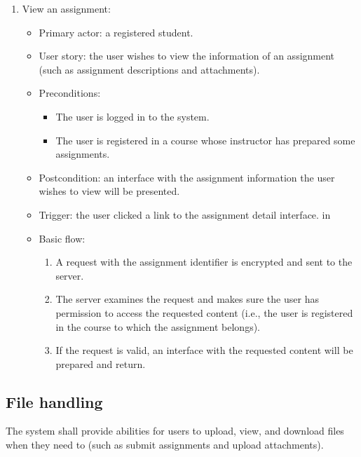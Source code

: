 \begin{enumerate}
\item View an assignment:
\begin{itemize}
    \item Primary actor: a registered student.
    \item User story: the user wishes to view the information of an assignment
     (such as assignment descriptions and attachments).
    \item Preconditions:
        \begin{itemize}
            \item The user is logged in to the system.
            \item The user is registered in a course whose instructor has
                prepared some assignments.
        \end{itemize}
    \item Postcondition: an interface with the assignment information the user
        wishes to view will be presented.
    \item Trigger: the user clicked a link to the assignment detail interface.
     in
    \item Basic flow:
        \begin{enumerate}
            \item A request with the assignment identifier is encrypted and
                sent to the server.
            \item The server examines the request and makes sure the user has
                permission to access the requested content (i.e., the user is
                registered in the course to which the assignment belongs).
            \item If the request is valid, an interface with the requested
                content will be prepared and return.
        \end{enumerate}
\end{itemize}
\end{enumerate}

\subsection{File handling}
The system shall provide abilities for users to upload, view, and download
files when they need to (such as submit assignments and upload attachments).

